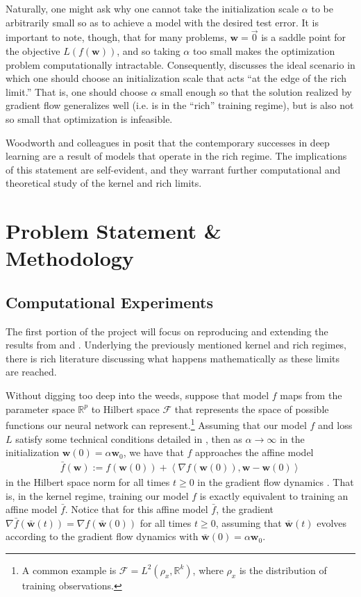 \documentclass{article}
\begin{document}
Naturally, one might ask why one cannot take the initialization scale $\alpha$ to be arbitrarily small so as to achieve a model with the desired test error. It is important to note, though, that for many problems, $\boldsymbol{w} = \vec{0}$ is a saddle point for the objective $L(f(\boldsymbol{w}))$, and so taking $\alpha$ too small makes the optimization problem computationally intractable. Consequently, \cite{woodworth2020kernel} discusses the ideal scenario in which one should choose an initialization scale that acts \enquote{at the edge of the rich limit.} That is, one should choose $\alpha$ small enough so that the solution realized by gradient flow generalizes well (i.e. is in the \enquote{rich} training regime), but is also not so small that optimization is infeasible. 

Woodworth and colleagues in \cite{woodworth2020kernel} posit that the contemporary successes in deep learning are a result of models that operate in the rich regime. The implications of this statement are self-evident, and they warrant further computational and theoretical study of the kernel and rich limits.

\section{Problem Statement \& Methodology}
\subsection{Computational Experiments}
The first portion of the project will focus on reproducing and extending the results from \cite{chizat2018lazy} and \cite{woodworth2020kernel}. Underlying the previously mentioned kernel and rich regimes, there is rich literature discussing what happens mathematically as these limits are reached. 

Without digging too deep into the weeds, suppose that model $f$ maps from the parameter space $\mathbb{R}^p$ to Hilbert space $\mathcal{F}$ that represents  the space of possible functions our neural network can represent.\footnote{A common example is $\mathcal{F} = L^2(\rho_x, \mathbb{R}^k)$, where $\rho_x$ is the distribution of training observations.} Assuming that our model $f$ and loss $L$ satisfy some technical conditions detailed in \cite{chizat2018lazy}, then as $\alpha \rightarrow \infty$ in the initialization $\boldsymbol{w}(0) = \alpha \boldsymbol{w}_0$, we have that $f$ approaches the affine model 
\begin{align}\label{linearizedmodel}
    \bar{f}(\boldsymbol{w}) := f(\boldsymbol{w}(0)) + \left\langle \nabla f(\boldsymbol{w}(0)), \boldsymbol{w} - \boldsymbol{w}(0) \right\rangle
\end{align}
in the Hilbert space norm for all times $t \geq 0$ in the gradient flow dynamics \cite{chizat2018lazy}. That is, in the kernel regime, training our model $f$ is exactly equivalent to training an affine model $\bar{f}$. Notice that for this affine model $\bar{f}$, the gradient $\nabla \bar{f}(\bar{\boldsymbol{w}}(t)) = \nabla f(\bar{\boldsymbol{w}}(0))$ for all times $t \geq 0$, assuming that $\bar{\boldsymbol{w}}(t)$ evolves according to the gradient flow dynamics with $\bar{\boldsymbol{w}}(0) = \alpha \boldsymbol{w}_0$.
\end{document}
